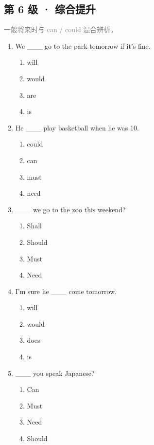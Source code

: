 \documentclass[11pt,a4paper]{ctexart}
\begin{document}
\subsection*{第 6 级 · 综合提升}
\noindent\textcolor{gray}{一般将来时与 can / could 混合辨析。}\par\smallskip
\begin{enumerate}[leftmargin=*,itemsep=4pt]
\item We \_\_\_ go to the park tomorrow if it’s fine.
\begin{enumerate}[label=\Alph*.,leftmargin=2em,itemsep=1pt,topsep=2pt]
\item will
\item would
\item are
\item is
\end{enumerate}
\item He \_\_\_ play basketball when he was 10.
\begin{enumerate}[label=\Alph*.,leftmargin=2em,itemsep=1pt,topsep=2pt]
\item could
\item can
\item must
\item need
\end{enumerate}
\item \_\_\_ we go to the zoo this weekend?
\begin{enumerate}[label=\Alph*.,leftmargin=2em,itemsep=1pt,topsep=2pt]
\item Shall
\item Should
\item Must
\item Need
\end{enumerate}
\item I’m sure he \_\_\_ come tomorrow.
\begin{enumerate}[label=\Alph*.,leftmargin=2em,itemsep=1pt,topsep=2pt]
\item will
\item would
\item does
\item is
\end{enumerate}
\item \_\_\_ you speak Japanese?
\begin{enumerate}[label=\Alph*.,leftmargin=2em,itemsep=1pt,topsep=2pt]
\item Can
\item Must
\item Need
\item Should

\end{enumerate}
\end{enumerate}
\end{document}
